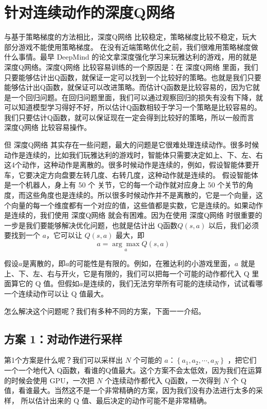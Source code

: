 \section{针对连续动作的深度Q网络}

与基于策略梯度的方法相比，深度Q网络 比较稳定，策略梯度比较不稳定，玩大部分游戏不能使用策略梯度。
在没有近端策略优化之前，我们很难用策略梯度做什么事情。最早 DeepMind 的论文拿深度强化学习来玩雅达利的游戏，用的就是 深度Q网络。深度Q网络 比较容易训练的一个原因是：在 深度Q网络 里面，我们只要能够估计出Q函数，就保证一定可以找到一个比较好的策略。也就是我们只要能够估计出Q函数，就保证可以改进策略。而估计Q函数是比较容易的，因为它就是一个回归问题。在回归问题里面，我们可以通过观察回归的损失有没有下降，就可以知道模型学习得好不好，所以估计Q函数相较于学习一个策略是比较容易的。我们只要估计Q函数，就可以保证现在一定会得到比较好的策略，所以一般而言 深度Q网络 比较容易操作。

但 深度Q网络 其实存在一些问题，最大的问题是它很难处理连续动作。很多时候动作是连续的，比如我们玩雅达利的游戏时，智能体只需要决定如上、下、左、右这4个动作，这种动作是离散的。很多时候动作是连续的，例如，假设智能体要开车，它要决定方向盘要左转几度、右转几度，这种动作就是连续的。
假设智能体是一个机器人，身上有 50 个 关节，它的每一个动作就对应身上 50 个关节的角度，而这些角度也是连续的。所以很多时候动作并不是离散的，它是一个向量，这个向量的每一个维度都有一个对应的值，这些值都是实数，它是连续的。如果动作是连续的，我们使用 深度Q网络 就会有困难。因为在使用 深度Q网络 时很重要的一步是我们要能够解决优化问题，也就是估计出 Q函数$Q(s,a)$ 以后，我们必须要找到一个 $a$，它可以让 $Q(s,a)$ 最大，即
\begin{equation}
  \label{eq:max_q_ch8}
  a=\underset{a}{\arg \max} Q(s, a)
\end{equation}

假设$a$是离散的，即$a$的可能性是有限的。例如，在雅达利的小游戏里面，$a$ 就是上、下、左、右与开火，它是有限的，我们可以把每一个可能的动作都代入 Q 里面算它的 Q 值。但假如$a$是连续的，我们无法穷举所有可能的连续动作，试试看哪一个连续动作可以让 Q 值最大。

怎么解决这个问题呢？我们有多种不同的方案，下面一一介绍。
\subsection{方案 1：对动作进行采样}
第1个方案是什么呢？我们可以采样出 $N$ 个可能的 $a$：$\left\{a_{1}, a_{2}, \cdots, a_{N}\right\}$ ，把它们一个一个地代入 Q函数，看谁的Q值最大。这个方案不会太低效，因为我们在运算的时候会使用 GPU，一次把 $N$ 个连续动作都代入 Q函数，一次得到 $N$ 个 Q 值，看谁最大。当然这不是一个非常精确的方案，因为我们没有办法进行太多的采样， 所以估计出来的 Q 值、最后决定的动作可能不是非常精确。
